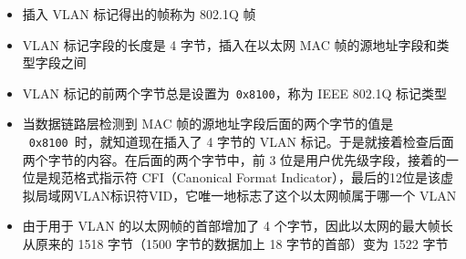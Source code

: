 \documentclass[cs4size,a4paper,10pt]{ctexart}
\begin{document}
\begin{itemize}
		\item 插入 VLAN 标记得出的帧称为 802.1Q 帧
		\item VLAN 标记字段的长度是 4 字节，插入在以太网 MAC 帧的源地址字段和类型字段之间
		\item VLAN 标记的前两个字节总是设置为\ \verb|0x8100|，称为 IEEE 802.1Q 标记类型
		\item 当数据链路层检测到 MAC 帧的源地址字段后面的两个字节的值是 \ \verb|0x8100|\ 时，就知道现在插入了 4 字节的 VLAN 标记。于是就接着检查后面两个字节的内容。在后面的两个字节中，前 3 位是用户优先级字段，接着的一位是规范格式指示符 CFI（Canonical Format Indicator），最后的12位是该虚拟局域网VLAN标识符VID，它唯一地标志了这个以太网帧属于哪一个 VLAN
		\item 由于用于 VLAN 的以太网帧的首部增加了 4 个字节，因此以太网的最大帧长从原来的 1518 字节（1500 字节的数据加上 18 字节的首部）变为 1522 字节
	\end{itemize}
\end{document}
